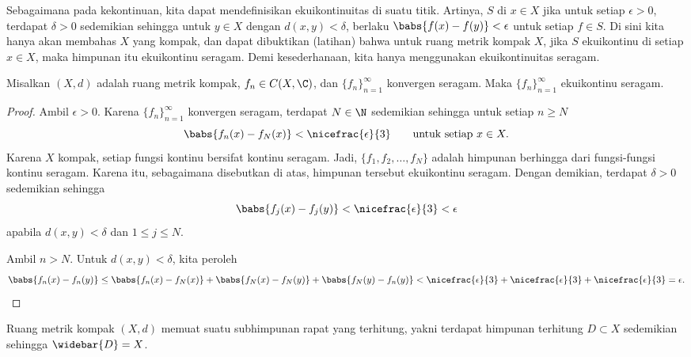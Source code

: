 Sebagaimana pada kekontinuan, kita dapat mendefinisikan ekuikontinuitas di suatu titik.
Artinya, $S$ \emph{} di $x \in X$
jika untuk setiap $\epsilon > 0$, terdapat $\delta > 0$
sedemikian sehingga untuk $y \in X$ dengan $d(x,y) < \delta$, berlaku
$\babs{f(x)-f(y)} < \epsilon$ untuk setiap $f \in S$.
Di sini kita hanya akan membahas $X$ yang kompak, dan
dapat dibuktikan (latihan) bahwa untuk ruang metrik kompak $X$,
jika $S$ ekuikontinu di setiap $x \in X$,
maka himpunan itu ekuikontinu seragam.  Demi kesederhanaan,
kita hanya menggunakan ekuikontinuitas seragam.

\begin{prop}
Misalkan $(X,d)$ adalah ruang metrik kompak,
$f_n \in C(X,\C)$, dan $\{ f_n \}_{n=1}^\infty$
konvergen seragam.  Maka $\{ f_n \}_{n=1}^\infty$ ekuikontinu seragam.
\end{prop}

\begin{proof}
Ambil $\epsilon > 0$.
Karena $\{ f_n \}_{n=1}^\infty$ konvergen seragam, terdapat $N \in \N$ sedemikian sehingga untuk
setiap $n \geq N$
\begin{equation*}
\babs{f_n(x)-f_N(x)} < \nicefrac{\epsilon}{3} \qquad \text{untuk setiap } x \in X.
\end{equation*}
Karena $X$ kompak, setiap fungsi kontinu bersifat kontinu seragam.
Jadi, $\{ f_1,f_2,\ldots,f_N \}$ adalah himpunan berhingga dari fungsi-fungsi kontinu
seragam.  Karena itu, sebagaimana disebutkan di atas, himpunan tersebut ekuikontinu seragam.
Dengan demikian, terdapat $\delta > 0$ sedemikian sehingga
\begin{equation*}
\babs{f_j(x)-f_j(y)} < \nicefrac{\epsilon}{3} < \epsilon
\end{equation*}
apabila $d(x,y) < \delta$ dan $1 \leq j \leq N$.

Ambil $n > N$.  Untuk $d(x,y) < \delta$, kita peroleh
\begin{equation*}
\babs{f_n(x)-f_n(y)}
\leq
\babs{f_n(x)-f_N(x)}
+
\babs{f_N(x)-f_N(y)}
+
\babs{f_N(y)-f_n(y)}
<
\nicefrac{\epsilon}{3}
+
\nicefrac{\epsilon}{3}
+
\nicefrac{\epsilon}{3}
=\epsilon . \qedhere
\end{equation*}
\end{proof}

\begin{prop}
Ruang metrik kompak $(X,d)$ memuat suatu subhimpunan rapat yang terhitung,
yakni terdapat himpunan terhitung $D \subset X$ sedemikian sehingga $\widebar{D} = X$.
\end{prop}

